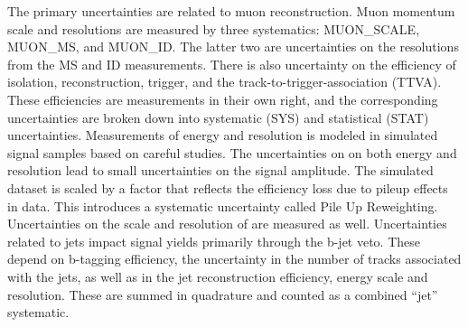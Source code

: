 The primary uncertainties are related to muon reconstruction.
Muon momentum scale and resolutions are measured by three systematics: MUON\_SCALE, MUON\_MS, and MUON\_ID. 
The latter two are uncertainties on the resolutions from the MS and ID measurements.
There is also uncertainty on the efficiency of isolation, reconstruction, trigger, and the track-to-trigger-association (TTVA). \cite{muonReco}
These efficiencies are measurements in their own right, and the corresponding uncertainties are broken down into systematic (SYS) and statistical (STAT) uncertainties.
Measurements of energy and resolution is modeled in simulated signal samples based on careful studies. \cite{elecReco}
The uncertainties on on both energy and resolution lead to small uncertainties on the signal amplitude.
The simulated dataset is scaled by a factor that reflects the efficiency loss due to pileup effects in data.
This introduces a systematic uncertainty called Pile Up Reweighting.
Uncertainties on the scale and resolution of \met are measured as well.
Uncertainties related to jets impact signal yields primarily through the b-jet veto.
These depend on b-tagging efficiency, the uncertainty in the number of tracks associated with the jets, as well as in the jet reconstruction efficiency, energy scale and resolution.
These are summed in quadrature and counted as a combined ``jet'' systematic.

